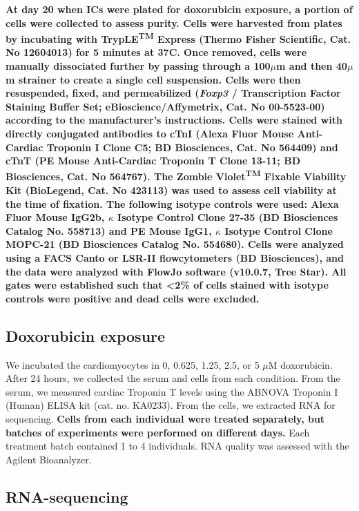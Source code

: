 \documentclass[9pt,lineno]{elife}
\newcommand{\tempbold}[1]{\textbf{#1}}
\begin{document}
\tempbold{At day 20 when ICs were plated for doxorubicin exposure, a portion of cells were collected to assess purity. Cells were harvested from plates by incubating with TrypLE\textsuperscript{TM} Express (Thermo Fisher Scientific, Cat. No 12604013) for 5 minutes at 37\textdegree{}C. Once removed, cells were manually dissociated further by passing through a 100$\mu$m and then 40$\mu$m strainer to create a single cell suspension. Cells were then resuspended, fixed, and permeabilized (\emph{Foxp3} / Transcription Factor Staining Buffer Set; eBioscience/Affymetrix, Cat. No 00-5523-00) according to the manufacturer's instructions. Cells were stained with directly conjugated antibodies to cTnI (Alexa Fluor\textregistered 647 Mouse Anti-Cardiac Troponin I Clone C5; BD Biosciences, Cat. No 564409) and cTnT (PE Mouse Anti-Cardiac Troponin T Clone 13-11; BD Biosciences, Cat. No 564767). The Zombie Violet\textsuperscript{TM} Fixable Viability Kit (BioLegend, Cat. No 423113) was used to assess cell viability at the time of fixation. The following isotype controls were used: Alexa Fluor\textregistered 647 Mouse IgG2b, $\kappa$ Isotype Control Clone 27-35 (BD Biosciences Catalog No. 558713) and PE Mouse IgG1, $\kappa$ Isotype Control Clone MOPC-21 (BD Biosciences Catalog No. 554680). Cells were analyzed using a FACS Canto or LSR-II flowcytometers (BD Biosciences), and the data were analyzed with FlowJo software (v10.0.7, Tree Star). All gates were established such that <2\% of cells stained with isotype controls were positive and dead cells were excluded.}

\subsection*{Doxorubicin exposure}

We incubated the cardiomyocytes in 0, 0.625, 1.25, 2.5, or 5 $\mu$M
doxorubicin. After 24 hours, we collected the serum and cells from each
condition. From the serum, we measured cardiac Troponin T levels using the
ABNOVA Troponin I (Human) ELISA kit (cat. no. KA0233). From the cells, we
extracted RNA for sequencing. \tempbold{Cells from each individual were treated separately, but batches of experiments were performed on different days.} Each treatment batch contained 1 to 4
individuals. RNA quality was assessed with the Agilent Bioanalyzer.

\subsection*{RNA-sequencing}
\end{document}
